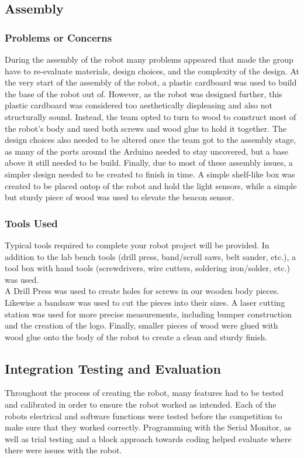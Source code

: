 \documentclass{article}
\begin{document}
\subsection{Assembly}
    \subsubsection{Problems or Concerns}
    During the assembly of the robot many problems appeared that made the group have to re-evaluate materials, design choices, and the complexity of the design. At the very start of the assembly of the robot, a plastic cardboard was used to build the base of the robot out of. However, as the robot was designed further, this plastic cardboard was considered too aesthetically displeasing and also not structurally sound. Instead, the team opted to turn to wood to construct most of the robot's body and used both screws and wood glue to hold it together. The design choices also needed to be altered once the team got to the assembly stage, as many of the ports around the Arduino needed to stay uncovered, but a base above it still needed to be build. Finally, due to most of these assembly issues, a simpler design needed to be created to finish in time. A simple shelf-like box was created to be placed ontop of the robot and hold the light sensors, while a simple but sturdy piece of wood was used to elevate the beacon sensor. 
    
    \subsubsection{Tools Used}
    Typical tools required to complete your robot project will be provided. In addition to the lab bench tools (drill press, band/scroll saws, belt sander, etc.), a tool box with hand tools (screwdrivers, wire cutters, soldering iron/solder, etc.) was used. \\
    
    A Drill Press was used to create holes for screws in our wooden body pieces. Likewise a bandsaw was used to cut the pieces into their sizes. A laser cutting station was used for more precise measurements, including bumper construction and the creation of the logo. Finally, smaller pieces of wood were glued with wood glue onto the body of the robot to create a clean and sturdy finish.

\subsection{Integration Testing and Evaluation}
    Throughout the process of creating the robot, many features had to be tested and calibrated in order to ensure the robot worked as intended. Each of the robots electrical and software functions were tested before the competition to make sure that they worked correctly. Programming with the Serial Monitor, as well as trial testing and a block approach towards coding helped evaluate where there were issues with the robot.
    
\end{document}
